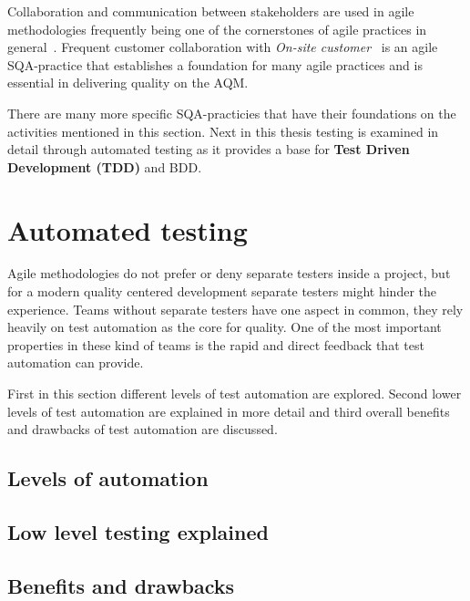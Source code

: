     Collaboration and communication between stakeholders are used in agile methodologies frequently being one of the
    cornerstones of agile practices in general~\cite{huo2004software}. Frequent customer collaboration with \textit{On-site customer}~\cite{huo2004software}
    is an agile SQA-practice that establishes a foundation for many agile practices and is essential in delivering
    quality on the AQM.

    There are many more specific SQA-practicies that have their foundations on the activities mentioned in this section.
    Next in this thesis testing is examined in detail through automated testing as it provides a base for \textbf{Test Driven Development (TDD)}
    and BDD.

\section{Automated testing} %
    Agile methodologies do not prefer or deny separate testers inside a project, but for a modern quality centered
    development separate testers might hinder the experience. Teams without separate testers have one aspect in common,
    they rely heavily on test automation as the core for quality. One of the most important properties in these kind of
    teams is the rapid and direct feedback that test automation can provide. ~\cite{prechelt2016quality}

    First in this section different levels of test automation are explored. Second lower levels of test automation are explained in more
    detail and third overall benefits and drawbacks of test automation are discussed.
    \subsection{Levels of automation}
    \subsection{Low level testing explained}
    \subsection{Benefits and drawbacks}
